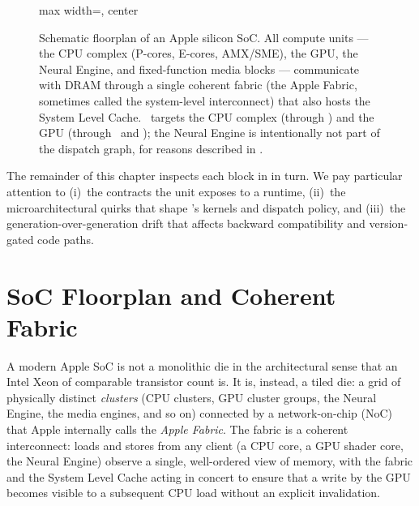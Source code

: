 \begin{figure}[t]
\begin{adjustbox}{max width=\textwidth, center}
\end{adjustbox}
\caption[Apple silicon SoC topology.]{Schematic floorplan of an Apple
silicon SoC. All compute units --- the CPU complex (P-cores, E-cores,
AMX/SME), the GPU, the Neural Engine, and fixed-function media blocks
--- communicate with DRAM through a single coherent fabric (the Apple
Fabric, sometimes called the system-level interconnect) that also
hosts the System Level Cache. \Lucid\ targets the CPU complex (through
\Accelerate) and the GPU (through \MLX\ and \MPSGraph); the Neural
Engine is intentionally not part of the dispatch graph, for reasons
described in .}
\label{fig:apple_silicon_topology}
\end{figure}

The remainder of this chapter inspects each block in
 in turn. We pay particular attention
to (i)~the contracts the unit exposes to a runtime, (ii)~the
microarchitectural quirks that shape \Lucid's kernels and dispatch
policy, and (iii)~the generation-over-generation drift that affects
backward compatibility and version-gated code paths.

\section{SoC Floorplan and Coherent Fabric}
\label{sec:apple_silicon:floorplan}

A modern Apple SoC is not a monolithic die in the architectural sense
that an Intel Xeon of comparable transistor count is. It is, instead,
a tiled die: a grid of physically distinct \emph{clusters} (CPU
clusters, GPU cluster groups, the Neural Engine, the media engines,
and so on) connected by a network-on-chip (NoC) that Apple internally
calls the \emph{Apple Fabric}. The fabric is a coherent interconnect:
loads and stores from any client (a CPU core, a GPU shader core, the
Neural Engine) observe a single, well-ordered view of memory, with the
fabric and the System Level Cache acting in concert to ensure that a
write by the GPU becomes visible to a subsequent CPU load without an
explicit invalidation.

